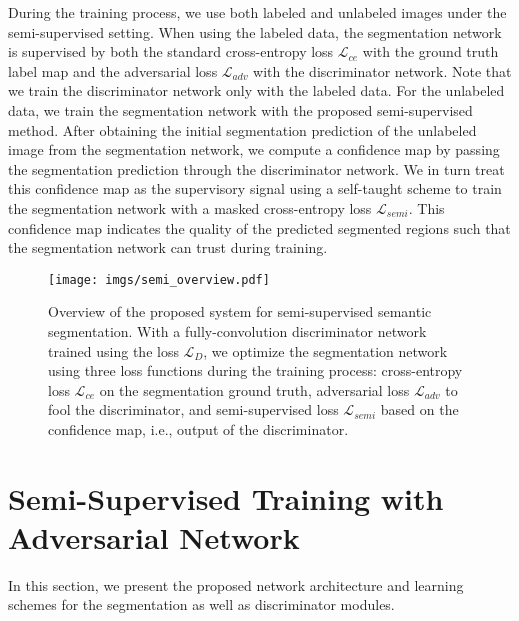 \documentclass{bmvc2k}
\begin{document}
	
	During the training process, we use both labeled and unlabeled images under the semi-supervised setting.
	When using the labeled data, the segmentation network is supervised by both the standard cross-entropy loss $\mathcal{L}_{ce}$ with the ground truth label map and the adversarial loss $\mathcal{L}_{adv}$ with the discriminator network.
	Note that we train the discriminator network only with the labeled data.
	For the unlabeled data, we train the segmentation network with the proposed semi-supervised method. After obtaining the initial segmentation prediction of the unlabeled image from the segmentation network, we compute a confidence map by passing the segmentation prediction through the discriminator network.
	We in turn treat this confidence map as the supervisory signal using a self-taught 
	scheme to train the segmentation network with 
	a masked cross-entropy loss $\mathcal{L}_{semi}$.
	This confidence map indicates the quality of 
	the predicted segmented regions such that the segmentation network can trust during training.
	\begin{figure}[t]
		\centering
		\texttt{[image: imgs/semi\_overview.pdf]}\\
		\vspace{-3mm}
		\caption{Overview of the proposed system for semi-supervised semantic segmentation. With a fully-convolution discriminator network trained using the loss $\mathcal{L}_{D}$, we optimize the segmentation network using three loss functions during the training process: cross-entropy loss $\mathcal{L}_{ce}$ on the segmentation ground truth, adversarial loss $\mathcal{L}_{adv}$ to fool the discriminator, and semi-supervised loss $\mathcal{L}_{semi}$ based on the confidence map, i.e., output of the discriminator.}
		\vspace{-0.5cm}
		\label{figure: semi_overview}
	\end{figure}
	\vspace{-3mm}
	
	\section{Semi-Supervised Training with Adversarial Network}
	\vspace{-2mm}
	
	In this section, we present the proposed network architecture and learning schemes for the segmentation as well as discriminator modules.
	
\end{document}
